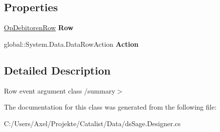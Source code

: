 \subsection*{Properties}
\begin{DoxyCompactItemize}
\item 
\hyperlink{class_products_1_1_data_1_1ds_sage_1_1_op_debitoren_row}{Op\+Debitoren\+Row} {\bfseries Row}\hypertarget{class_products_1_1_data_1_1ds_sage_1_1_op_debitoren_row_change_event_a1d3021f33fc273ee1a5d01820758513c}{}\label{class_products_1_1_data_1_1ds_sage_1_1_op_debitoren_row_change_event_a1d3021f33fc273ee1a5d01820758513c}

\item 
global\+::\+System.\+Data.\+Data\+Row\+Action {\bfseries Action}\hypertarget{class_products_1_1_data_1_1ds_sage_1_1_op_debitoren_row_change_event_a611e4306a35d21d0706add919d1a3036}{}\label{class_products_1_1_data_1_1ds_sage_1_1_op_debitoren_row_change_event_a611e4306a35d21d0706add919d1a3036}

\end{DoxyCompactItemize}


\subsection{Detailed Description}
Row event argument class /summary$>$ 

The documentation for this class was generated from the following file\+:\begin{DoxyCompactItemize}
\item 
C\+:/\+Users/\+Axel/\+Projekte/\+Catalist/\+Data/ds\+Sage.\+Designer.\+cs\end{DoxyCompactItemize}
